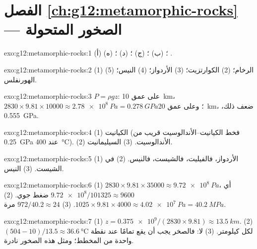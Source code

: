 \section*{الفصل \ref{ch:g12:metamorphic-rocks} --- الصخور المتحولة}

\begin{solution}{exo:g12:metamorphic-rocks:1}
(أ) ؛ (ب) ؛ (ج) ؛ (د) ؛
(ه) .
\end{solution}

\begin{solution}{exo:g12:metamorphic-rocks:2}
(1) الرخام؛ (2) الكوارتزيت؛ (3) الأردواز؛ (4) النيس؛ (5) الهورنفلس.
\end{solution}

\begin{solution}{exo:g12:metamorphic-rocks:3}
$P = \rho g z$: على عمق \qty{10}{km}، $2830 \times 9.81 \times \num{10000} \approx
\qty{2.78e8}{Pa} = \qty{0.278}{GPa}$؛ وعلى عمق \qty{20}{km}، ضعف ذلك،
\qty{0.555}{GPa}.
\end{solution}

\begin{solution}{exo:g12:metamorphic-rocks:4}
(1) الكيانيت (فخط الكيانيت--الأندالوسيت قريب من \qty{0.25}{GPa} عند
\qty{400}{\celsius}). (2) الأندالوسيت. (3) السيليمانيت.
\end{solution}

\begin{solution}{exo:g12:metamorphic-rocks:5}
(1) الأردواز، فالفيليت، فالشيست، فالنيس. (2) في الشيست. (3) النيس.
\end{solution}

\begin{solution}{exo:g12:metamorphic-rocks:6}
(1) $2830 \times 9.81 \times \num{35000} \approx \qty{9.72e8}{Pa}$، أي
$\num{9.72e8}/101325 \approx \num{9600}$ ضغط جوي. (2) $1025 \times 9.81
\times 4000 \approx \qty{4.02e7}{Pa} = \qty{40.2}{MPa}$. (3) $972/40.2
\approx 24$ مرة.
\end{solution}

\begin{solution}{exo:g12:metamorphic-rocks:7}
(1) $z = \num{0.375e9}/(2830 \times 9.81) \approx \qty{13.5}{km}$.
(2) $(504 - 10)/13.5 \approx \qty{36.6}{\celsius}$ لكل كيلومتر. (3) لا:
فالصخر يجب أن يقع تمامًا عند نقطة واحدة من المخطط؛ ومثل هذه الصخور
نادرة.
\end{solution}

